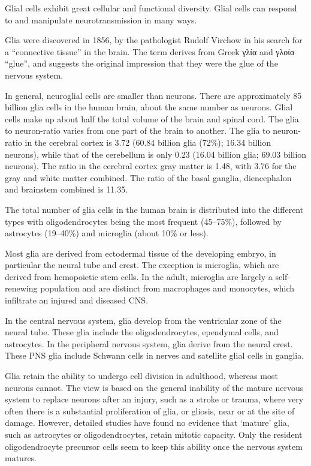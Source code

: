 Glial cells exhibit great cellular and functional diversity. Glial cells can respond to and manipulate neurotransmission in many ways.

Glia were discovered in 1856, by the pathologist Rudolf Virchow in his search for a ``connective tissue'' in the brain. The term derives from Greek γλία and γλοία ``glue'', and suggests the original impression that they were the glue of the nervous system.

In general, neuroglial cells are smaller than neurons. There are approximately 85 billion glia cells in the human brain, about the same number as neurons. Glial cells make up about half the total volume of the brain and spinal cord. The glia to neuron-ratio varies from one part of the brain to another. The glia to neuron-ratio in the cerebral cortex is 3.72 (60.84 billion glia (72\%); 16.34 billion neurons), while that of the cerebellum is only 0.23 (16.04 billion glia; 69.03 billion neurons). The ratio in the cerebral cortex gray matter is 1.48, with 3.76 for the gray and white matter combined. The ratio of the basal ganglia, diencephalon and brainstem combined is 11.35.

The total number of glia cells in the human brain is distributed into the different types with oligodendrocytes being the most frequent (45--75\%), followed by astrocytes (19--40\%) and microglia (about 10\% or less).

Most glia are derived from ectodermal tissue of the developing embryo, in particular the neural tube and crest. The exception is microglia, which are derived from hemopoietic stem cells. In the adult, microglia are largely a self-renewing population and are distinct from macrophages and monocytes, which infiltrate an injured and diseased CNS.

In the central nervous system, glia develop from the ventricular zone of the neural tube. These glia include the oligodendrocytes, ependymal cells, and astrocytes. In the peripheral nervous system, glia derive from the neural crest. These PNS glia include Schwann cells in nerves and satellite glial cells in ganglia.

Glia retain the ability to undergo cell division in adulthood, whereas most neurons cannot. The view is based on the general inability of the mature nervous system to replace neurons after an injury, such as a stroke or trauma, where very often there is a substantial proliferation of glia, or gliosis, near or at the site of damage. However, detailed studies have found no evidence that `mature' glia, such as astrocytes or oligodendrocytes, retain mitotic capacity. Only the resident oligodendrocyte precursor cells seem to keep this ability once the nervous system matures.

